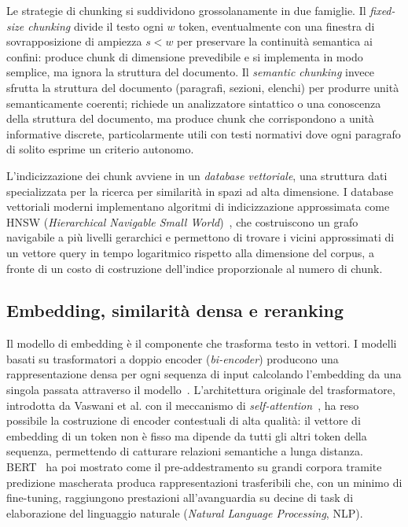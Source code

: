 Le strategie di chunking si suddividono grossolanamente in due famiglie.
Il \emph{fixed-size chunking} divide il testo ogni $w$ token, eventualmente
con una finestra di sovrapposizione di ampiezza $s < w$ per preservare la
continuità semantica ai confini: produce chunk di dimensione prevedibile e
si implementa in modo semplice, ma ignora la struttura del documento.
Il \emph{semantic chunking} invece sfrutta la struttura del documento
(paragrafi, sezioni, elenchi) per produrre unità semanticamente coerenti;
richiede un analizzatore sintattico o una conoscenza della struttura del
documento, ma produce chunk che corrispondono a unità informative discrete,
particolarmente utili con testi normativi dove ogni paragrafo di solito
esprime un criterio autonomo.

L'indicizzazione dei chunk avviene in un \emph{database vettoriale}, una
struttura dati specializzata per la ricerca per similarità in spazi ad
alta dimensione. I database vettoriali moderni implementano algoritmi di
indicizzazione approssimata come HNSW (\emph{Hierarchical Navigable Small
World})~\cite{chromadb}, che costruiscono un grafo navigabile a più livelli
gerarchici e permettono di trovare i vicini approssimati di un vettore query
in tempo logaritmico rispetto alla dimensione del corpus, a fronte di un
costo di costruzione dell'indice proporzionale al numero di chunk.

\subsection{Embedding, similarità densa e reranking}
\label{subsec:embedding}

Il modello di embedding è il componente che trasforma testo in vettori.
I modelli basati su trasformatori a doppio encoder (\emph{bi-encoder})
producono una rappresentazione densa per ogni sequenza di input calcolando
l'embedding da una singola passata attraverso il modello~\cite{vaswani2017attention}.
L'architettura originale del trasformatore, introdotta da Vaswani et al.
con il meccanismo di \emph{self-attention}~\cite{vaswani2017attention}, ha
reso possibile la costruzione di encoder contestuali di alta qualità: il
vettore di embedding di un token non è fisso ma dipende da tutti gli altri
token della sequenza, permettendo di catturare relazioni semantiche a lunga
distanza. BERT~\cite{devlin2019bert} ha poi mostrato come il pre-addestramento
su grandi corpora tramite predizione mascherata produca rappresentazioni
trasferibili che, con un minimo di fine-tuning, raggiungono prestazioni
all'avanguardia su decine di task di elaborazione del linguaggio naturale (\emph{Natural Language Processing}, NLP).


